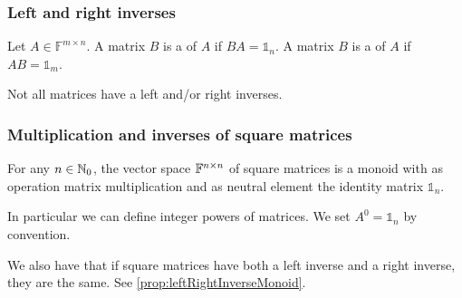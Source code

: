 \subsubsection{Left and right inverses}
\begin{definition}
Let $A\in \mathbb{F}^{m\times n}$. A matrix $B$ is a  of $A$ if $BA = \mathbb{1}_n$. A matrix $B$ is a  of $A$ if $AB = \mathbb{1}_m$.
\end{definition}
Not all matrices have a left and/or right inverses.

\subsubsection{Multiplication and inverses of square matrices}
\begin{lemma}
For any $n\in\mathbb{N}_0$, the vector space $\mathbb{F}^{n\times n}$ of square matrices is a monoid with as operation matrix multiplication and as neutral element the identity matrix $\mathbb{1}_n$.
\end{lemma}

In particular we can define integer powers of matrices. We set $A^0 = \mathbb{1}_n$ by convention.

We also have that if square matrices have both a left inverse and a right inverse, they are the same. See \ref{prop:leftRightInverseMonoid}.

